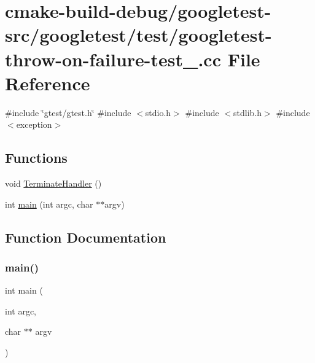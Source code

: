 \hypertarget{googletest-throw-on-failure-test___8cc}{}\section{cmake-\/build-\/debug/googletest-\/src/googletest/test/googletest-\/throw-\/on-\/failure-\/test\+\_\+.cc File Reference}
\label{googletest-throw-on-failure-test___8cc}
{\ttfamily \#include \char`\"{}gtest/gtest.\+h\char`\"{}}\newline
{\ttfamily \#include $<$stdio.\+h$>$}\newline
{\ttfamily \#include $<$stdlib.\+h$>$}\newline
{\ttfamily \#include $<$exception$>$}\newline
\subsection*{Functions}
\begin{DoxyCompactItemize}
\item 
void \mbox{\hyperlink{googletest-throw-on-failure-test___8cc_a478ad0386ef3cac98d230812ed07eeda}{Terminate\+Handler}} ()
\item 
int \mbox{\hyperlink{googletest-throw-on-failure-test___8cc_a3c04138a5bfe5d72780bb7e82a18e627}{main}} (int argc, char $\ast$$\ast$argv)
\end{DoxyCompactItemize}


\subsection{Function Documentation}
\mbox{\label{googletest-throw-on-failure-test___8cc_a3c04138a5bfe5d72780bb7e82a18e627}} 
\subsubsection{\texorpdfstring{main()}{main()}}
{\footnotesize\ttfamily int main (\begin{DoxyParamCaption}\item[{int}]{argc,  }\item[{char $\ast$$\ast$}]{argv }\end{DoxyParamCaption})}

